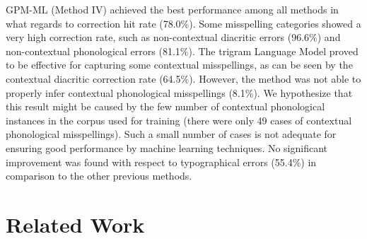 GPM-ML (Method IV) achieved the best performance among all methods in what regards to correction hit rate (78.0\%). Some misspelling categories showed a very high correction rate, such as non-contextual diacritic errors (96.6\%) and non-contextual phonological errors (81.1\%). The trigram Language Model proved to be effective for capturing some contextual misspellings, as can be seen by the contextual diacritic correction rate (64.5\%). However, the method was not able to properly infer contextual phonological misspellings (8.1\%). We hypothesize that this result might be caused by the few number of contextual phonological instances in the corpus used for training (there were only 49 cases of contextual phonological misspellings). Such a small number of cases is not adequate for ensuring good performance by machine learning techniques. No significant improvement was found with respect to typographical errors (55.4\%) in comparison to the other previous methods.


\section{Related Work}\label{sec:speller-related}

